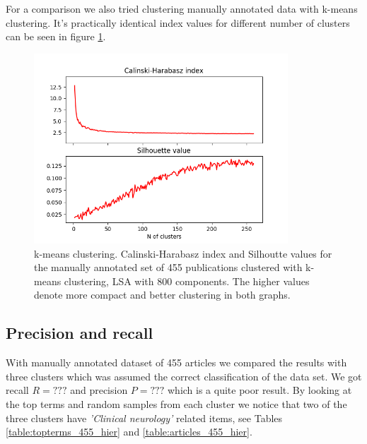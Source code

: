 For a comparison we also tried clustering manually annotated data
with k-means clustering. It's practically identical index values 
for different number of clusters can be seen in figure \ref{fig:ch-silh02}.


\begin{figure}[ht]
  \begin{center}    
\includegraphics[width=9.5cm]{images/c-h-silh-index-plot-519-2_260-800-kmeans.png}
    \caption{k-means clustering. Calinski-Harabasz index and Silhoutte values for the
    manually annotated set of 455 publications clustered with k-means 
    clustering, LSA with 800 components. The higher values denote 
    more compact and better clustering in both graphs.}
    \label{fig:ch-silh02}
  \end{center}
\end{figure}

% 

% 


\subsection{Precision and recall}
With manually annotated dataset of 455 articles we compared 
the results with three clusters which was assumed the correct 
classification of the data set. We got recall $R = ???$ and 
precision $P = ???$ which is
a quite poor result. By looking at the top terms and random samples
from each cluster we notice that two of the three clusters have 
\emph{'Clinical neurology'} related items, see Tables
\ref{table:topterms_455_hier} and \ref{table:articles_455_hier}.

